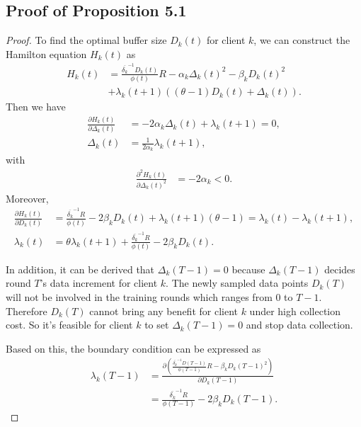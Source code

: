\documentclass{article}
\theoremstyle{plain}
\theoremstyle{definition}
\theoremstyle{remark}
\begin{document}
\subsection{Proof of Proposition 5.1}
\begin{proof}
    To find the optimal buffer size $D_k(t)$ for client $k$, we can construct the  Hamilton equation $H_k(t)$ as
    \begin{align}
      H_k(t) & = \frac{\overline{\delta_k}^{-1}D_k(t)}{\phi(t)}R - \alpha_k {\Delta_k(t)}^2 - \beta_k {D_k(t)^2} \nonumber \\
            & + \lambda_k(t+1)\left((\theta-1) D_k(t) + \Delta_k(t)\right).
    \end{align}
    Then we have
    \begin{align}
      \frac{\partial H_k(t)}{\partial \Delta_k(t)} & = -2 \alpha_k \Delta_k(t) + \lambda_k(t+1) = 0, \\
      \Delta_k(t)                                  & = \frac{1}{2\alpha_k} \lambda_k(t+1), 
    \end{align}
    with
    \begin{align}
      \frac{\partial^2 H_k(t)}{\partial {\Delta_k(t)}^2} & = -2\alpha_k < 0.
    \end{align}
    Moreover,
    \begin{align}
      \frac{\partial H_k(t)}{\partial D_k(t)} & = \frac{\overline{\delta_k}^{-1}R}{\phi(t)} - 2\beta_k D_k(t) + \lambda_k(t+1)(\theta - 1) = \lambda_k(t) - \lambda_k(t+1), \\
      \lambda_k(t)                            & = \theta \lambda_k(t+1) + \frac{\overline{\delta_k}^{-1}R}{\phi(t)} - 2\beta_k D_k(t).
    \end{align}
  
    In addition, it can be derived that $\Delta_k(T-1) = 0$ because $\Delta_k(T-1)$ decides round $T$'s data increment for client $k$.
    The newly sampled data points $D_k(T)$ will not be involved in the training rounds which ranges from 0 to $T-1$.
    Therefore $D_k(T)$ cannot bring any benefit for client $k$ under high collection cost.
    So it's feasible for client $k$ to set $\Delta_k(T-1) = 0$ and stop data collection.
  
    Based on this, the boundary condition can be expressed as
    \begin{align}
      \lambda_k(T-1) & = \frac{\partial \left(\frac{\overline{\delta_k}^{-1}D(T-1)}{\phi(T-1)} R - \beta_k{D_k(T-1)}^2 \right)}{\partial D_k(T-1)} \\
                     & = \frac{\overline{\delta_k}^{-1}R}{\phi(T-1)}- 2\beta_k D_k(T-1).
    \end{align}
  

\end{proof}
\end{document}

